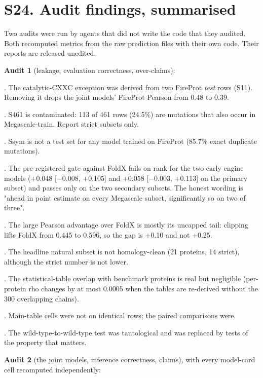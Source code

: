 \documentclass[11pt,a4paper]{article}
\begin{document}
\section{S24. Audit findings, summarised}

Two audits were run by agents that did not write the code that they audited. Both recomputed metrics from the raw
prediction files with their own code. Their reports are released unedited.

\textbf{Audit 1} (leakage, evaluation correctness, over-claims):

\par{}. The catalytic-CXXC exception was derived from two FireProt \emph{test} rows (S11). Removing it drops the joint
   models' FireProt Pearson from 0.48 to 0.39.
\par{}. S461 is contaminated: 113 of 461 rows (24.5\%) are mutations that also occur in Megascale-train. Report strict
   subsets only.
\par{}. Ssym is not a test set for any model trained on FireProt (85.7\% exact duplicate mutations).
\par{}. The pre-registered gate against FoldX fails on rank for the two early engine models (+0.048 [$-$0.008, +0.105]
   and +0.058 [$-$0.003, +0.113] on the primary subset) and passes only on the two secondary subsets. The honest
   wording is "ahead in point estimate on every Megascale subset, significantly so on two of three".
\par{}. The large Pearson advantage over FoldX is mostly its uncapped tail: clipping lifts FoldX from 0.445 to 0.596,
   so the gap is +0.10 and not +0.25.
\par{}. The headline natural subset is not homology-clean (21 proteins, 14 strict), although the strict number is not
   lower.
\par{}. The statistical-table overlap with benchmark proteins is real but negligible (per-protein rho changes by at
   most 0.0005 when the tables are re-derived without the 300 overlapping chains).
\par{}. Main-table cells were not on identical rows; the paired comparisons were.
\par{}. The wild-type-to-wild-type test was tautological and was replaced by tests of the property that matters.

\textbf{Audit 2} (the joint models, inference correctness, claims), with every model-card cell recomputed
independently:
\end{document}
